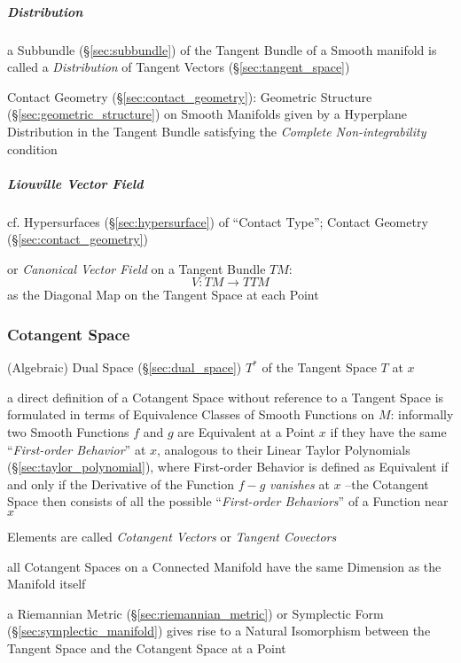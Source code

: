 \subparagraph{Distribution}\label{sec:tangent_bundle_distribution}\hfill

a Subbundle (\S\ref{sec:subbundle}) of the Tangent Bundle of a Smooth manifold
is called a \emph{Distribution} of Tangent Vectors (\S\ref{sec:tangent_space})

\fist Contact Geometry (\S\ref{sec:contact_geometry}): Geometric Structure
(\S\ref{sec:geometric_structure}) on Smooth Manifolds given by a Hyperplane
Distribution in the Tangent Bundle satisfying the \emph{Complete
  Non-integrability} condition



\subparagraph{Liouville Vector Field}\label{sec:liouville_vector_field}\hfill

cf. Hypersurfaces (\S\ref{sec:hypersurface}) of ``Contact Type''; \fist Contact
Geometry (\S\ref{sec:contact_geometry})

or \emph{Canonical Vector Field} on a Tangent Bundle $TM$:
\[
  V : TM \rightarrow TTM
\]
as the Diagonal Map on the Tangent Space at each Point



\subsubsection{Cotangent Space}\label{sec:cotangent_space}

(Algebraic) Dual Space (\S\ref{sec:dual_space}) $T^*$ of the Tangent Space $T$
at $x$

a direct definition of a Cotangent Space without reference to a Tangent Space
is formulated in terms of Equivalence Classes of Smooth Functions on $M$:
informally two Smooth Functions $f$ and $g$ are Equivalent at a Point $x$ if
they have the same ``\emph{First-order Behavior}'' at $x$, analogous to their
Linear Taylor Polynomials (\S\ref{sec:taylor_polynomial}), where First-order
Behavior is defined as Equivalent if and only if the Derivative of the Function
$f-g$ \emph{vanishes} at $x$ --the Cotangent Space then consists of all the
possible ``\emph{First-order Behaviors}'' of a Function near $x$

Elements are called \emph{Cotangent Vectors} or \emph{Tangent Covectors}

all Cotangent Spaces on a Connected Manifold have the same Dimension as the
Manifold itself

a Riemannian Metric (\S\ref{sec:riemannian_metric}) or Symplectic Form
(\S\ref{sec:symplectic_manifold}) gives rise to a Natural Isomorphism between
the Tangent Space and the Cotangent Space at a Point



